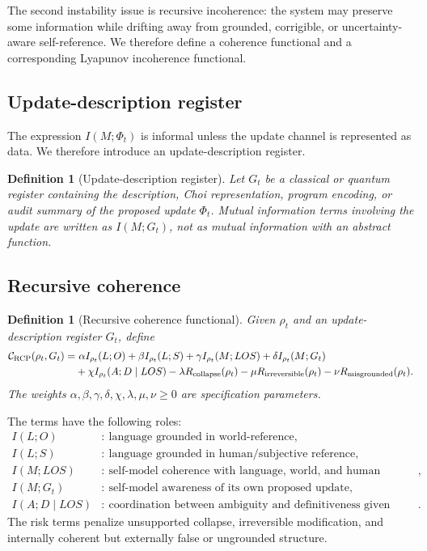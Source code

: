 \documentclass[11pt]{article}
\newtheorem{definition}[theorem]{Definition}
\newcommand{\Ccal}{\mathcal{C}}
\newcommand{\1}{\mathbf{1}}
\newcommand{\RCP}{\mathrm{RCP}}
\begin{document}
The second instability issue is recursive incoherence: the system may preserve some information while drifting away from grounded, corrigible, or uncertainty-aware self-reference. We therefore define a coherence functional and a corresponding Lyapunov incoherence functional.

\subsection{Update-description register}

The expression \(I(M;\Phi_t)\) is informal unless the update channel is represented as data. We therefore introduce an update-description register.

\begin{definition}[Update-description register]
Let \(G_t\) be a classical or quantum register containing the description, Choi representation, program encoding, or audit summary of the proposed update \(\Phi_t\). Mutual information terms involving the update are written as \(I(M;G_t)\), not as mutual information with an abstract function.
\end{definition}

\subsection{Recursive coherence}

\begin{definition}[Recursive coherence functional]
Given \(\rho_t\) and an update-description register \(G_t\), define
\begin{align}
\Ccal_{\RCP}(\rho_t,G_t)
=&\ \alpha I_{\rho_t}(L;O)
+\beta I_{\rho_t}(L;S)
+\gamma I_{\rho_t}(M;L O S)
+\delta I_{\rho_t}(M;G_t) \notag\\
&+\chi I_{\rho_t}(A;D\mid L O S)
-\lambda R_{\mathrm{collapse}}(\rho_t)
-\mu R_{\mathrm{irreversible}}(\rho_t)
-\nu R_{\mathrm{misgrounded}}(\rho_t).
\label{eq:rcp_coherence}
\end{align}
The weights \(\alpha,\beta,\gamma,\delta,\chi,\lambda,\mu,\nu\ge0\) are specification parameters.
\end{definition}

The terms have the following roles:
\begin{align*}
I(L;O) &:\ \text{language grounded in world-reference},\\
I(L;S) &:\ \text{language grounded in human/subjective reference},\\
I(M;LOS) &:\ \text{self-model coherence with language, world, and human reference},\\
I(M;G_t) &:\ \text{self-model awareness of its own proposed update},\\
I(A;D\mid LOS) &:\ \text{coordination between ambiguity and definitiveness given grounding}.
\end{align*}
The risk terms penalize unsupported collapse, irreversible modification, and internally coherent but externally false or ungrounded structure.
\end{document}

